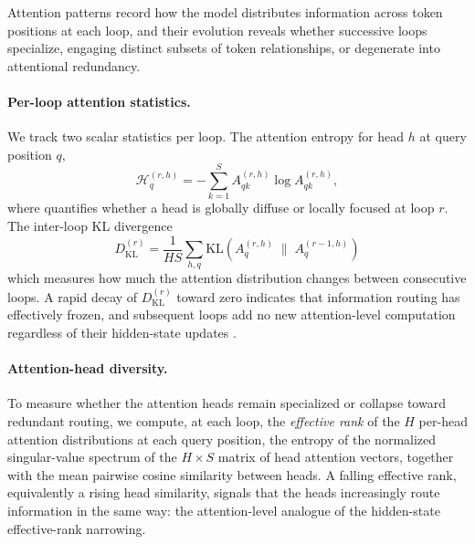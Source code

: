 Attention patterns record how the model distributes information across token positions at each loop, and their evolution reveals whether successive loops specialize, engaging distinct subsets of token relationships, or degenerate into attentional redundancy.

\paragraph{Per-loop attention statistics.}
We track two scalar statistics per loop.
The attention entropy for head $h$ at query position $q$,
\begin{equation}
  \mathcal{H}^{(r,h)}_q = -\sum_{k=1}^S
    A^{(r,h)}_{qk} \log A^{(r,h)}_{qk},
  \label{eq:attn-entropy}
\end{equation}
where quantifies whether a head is globally diffuse or locally focused at loop $r$.
The inter-loop KL divergence
\begin{equation}
  D_{\text{KL}}^{(r)} = \frac{1}{HS}\sum_{h,q}
    \mathrm{KL}\!\left(A^{(r,h)}_q \;\|\; A^{(r-1,h)}_q\right)
  \label{eq:attn-div}
\end{equation}
which measures how much the attention distribution changes between consecutive loops.
A rapid decay of $D_{\text{KL}}^{(r)}$ toward zero indicates that
information routing has effectively frozen, and subsequent loops add no new
attention-level computation regardless of their hidden-state updates
\citep{lu2025latent}.

\paragraph{Attention-head diversity.}
To measure whether the attention heads remain specialized or collapse toward
redundant routing, we compute, at each loop, the \emph{effective rank} of the
$H$ per-head attention distributions at each query position, the entropy of
the normalized singular-value spectrum of the $H\times S$ matrix of head
attention vectors, together with the mean pairwise cosine similarity between
heads. A falling effective rank, equivalently a rising head similarity, signals
that the heads increasingly route information in the same way: the
attention-level analogue of the hidden-state effective-rank narrowing.

